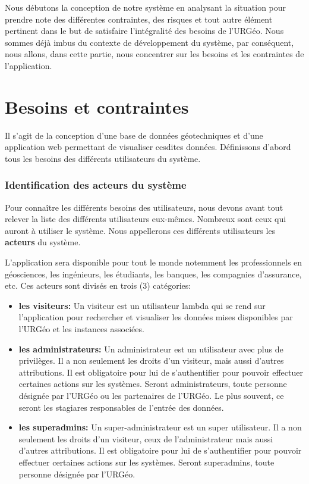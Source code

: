 Nous débutons la conception de notre système en analysant la
situation pour prendre note des différentes contraintes, des risques
et tout autre élément pertinent dans le but de satisfaire l'intégralité
des besoins de l'URGéo.  Nous sommes déjà imbus du contexte de développement
du système, par conséquent, nous allons, dans cette partie, nous concentrer
sur les besoins et les contraintes de l'application.
\section{Besoins et contraintes}
        Il s'agit de la conception d'une base de données géotechniques et d'une
        application web permettant de visualiser cesdites données. Définissons
        d'abord tous les besoins des différents utilisateurs du système.
        \subsubsection{Identification des acteurs du système}
        Pour connaître les différents besoins des utilisateurs, nous devons
        avant tout relever la liste des différents utilisateurs eux-mêmes.
        Nombreux sont ceux qui auront à utiliser le système. Nous appellerons ces différents
        utilisateurs  les \textbf{acteurs} du système.
        \par
        L'application sera disponible pour tout le monde notemment les
        professionnels en géosciences, les ingénieurs, les étudiants, les banques, les 
        compagnies d'assurance, etc.
        Ces acteurs sont divisés en trois (3) catégories:
        \begin{itemize} 
                \item \textbf{les visiteurs: }
                Un visiteur est un utilisateur lambda qui se rend sur l'application pour rechercher et visualiser
                les données mises disponibles par l'URGéo et les instances associées. 
              
                \item \textbf{les administrateurs: }
                Un administrateur est un utilisateur avec plus de privilèges. Il a non seulement les droits d'un visiteur,
                mais aussi d'autres attributions. Il est obligatoire pour lui de s'authentifier pour pouvoir 
                effectuer certaines actions sur les systèmes. Seront administrateurs, toute personne désignée par l'URGéo
                ou les partenaires de l'URGéo. Le plus souvent, ce seront les stagiares responsables de l'entrée des données.

                \item \textbf{les superadmins: }
                Un super-administrateur est un super utilisateur. Il a non seulement les droits d'un visiteur,
                ceux de l'administrateur mais aussi d'autres attributions. Il est obligatoire pour lui de s'authentifier pour pouvoir 
                effectuer certaines actions sur les systèmes. Seront superadmins, toute personne désignée par l'URGéo.
            \end{itemize}   
